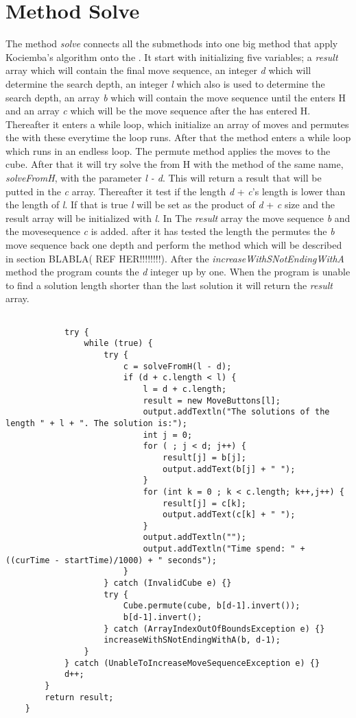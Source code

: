 \section{Method Solve}

The method \textit{solve} connects all the submethods into one big method that apply Kociemba's algorithm onto the \rubik{}. It start with initializing five variables; a \textit{result} array which will contain the final move sequence, an integer \textit{d} which will determine the search depth, an integer \textit{l} which also is used to determine the search depth, an array \textit{b} which will contain the move sequence until the \rubik{} enters H and an array \textit{c} which will be the move sequence after the \rubik{} has entered H. Thereafter it enters a while loop, which initialize an array of moves and permutes the \rubik{} with these everytime the loop runs. After that the method enters a while loop which runs in an endless loop. The permute method applies the moves to the cube. After that it will try solve the \rubik{} from H with the method of the same name, \textit{solveFromH}, with the parameter \textit{l - d}.  This will return a result that will be putted in the \textit{c} array. Thereafter it test if the length \textit{d} + \textit{c}'s length is lower than the length of \textit{l}. If that is true \textit{l} will be set as the product of \textit{d} + \textit{c} size and the result array will be initialized with \textit{l}. In The \textit{result} array the move sequence \textit{b} and the movesequence \textit{c} is added. after it has tested the length the \rubik{}  permutes the \textit{b} move sequence back one depth and perform the  method which will be described in section BLABLA( REF HER!!!!!!!!). After the  \textit{increaseWithSNotEndingWithA} method the program counts the \textit{d} integer up by one. When the program is unable to find a solution length shorter than the last solution it will return the \textit{result} array.


\begin{verbatim}
			
			try {
				while (true) {
					try {
						c = solveFromH(l - d);
						if (d + c.length < l) {
							l = d + c.length;
							result = new MoveButtons[l];
							output.addTextln("The solutions of the length " + l + ". The solution is:");
							int j = 0;
							for ( ; j < d; j++) {
								result[j] = b[j];
								output.addText(b[j] + " ");
							}
							for (int k = 0 ; k < c.length; k++,j++) {
								result[j] = c[k];
								output.addText(c[k] + " ");
							}
							output.addTextln("");
							output.addTextln("Time spend: " + ((curTime - startTime)/1000) + " seconds");
						}
					} catch (InvalidCube e) {}
					try {
						Cube.permute(cube, b[d-1].invert());
						b[d-1].invert();
					} catch (ArrayIndexOutOfBoundsException e) {}
					increaseWithSNotEndingWithA(b, d-1);
				}
			} catch (UnableToIncreaseMoveSequenceException e) {}
			d++;
		}
		return result;
	}
\end{verbatim}